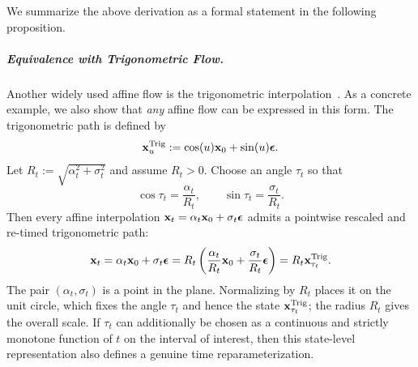 We summarize the above derivation as a formal statement in the following proposition.


\subparagraph{Equivalence with Trigonometric Flow.}
Another widely used affine flow is the trigonometric interpolation~\citep{salimans2021progressive,albergo2023stochastic,lu2024simplifying}. 
As a concrete example, we also show that \emph{any} affine flow can be expressed in this form. 
The trigonometric path is defined by
\begin{align}\label{eq:trig-para}
{\mathbf{x}}^{\mathrm{Trig}}_u := \cos(u) {\mathbf{x}}_0 + \sin(u){\bm{\epsilon}} .
\end{align}
Let $R_t := \sqrt{\alpha_t^2 + \sigma_t^2}$ and assume $R_t>0$. Choose an angle $\tau_t$ so that
\[
\cos \tau_t = \frac{\alpha_t}{R_t},
\qquad
\sin \tau_t = \frac{\sigma_t}{R_t}.
\]
Then every affine interpolation ${\mathbf{x}}_t=\alpha_t{\mathbf{x}}_0+\sigma_t{\bm{\epsilon}}$ admits a pointwise rescaled and re-timed trigonometric path:
\begin{align}\label{eq:any-to-trig}
{\mathbf{x}}_t
= \alpha_t{\mathbf{x}}_0+\sigma_t{\bm{\epsilon}}
= R_t \left(\frac{\alpha_t}{R_t}{\mathbf{x}}_0+\frac{\sigma_t}{R_t}{\bm{\epsilon}}\right)
= R_t {\mathbf{x}}^{\mathrm{Trig}}_{\tau_t}.
\end{align}
The pair $(\alpha_t,\sigma_t)$ is a point in the plane. Normalizing by $R_t$ places it on the unit circle, which fixes the angle $\tau_t$ and hence the state ${\mathbf{x}}^{\mathrm{Trig}}_{\tau_t}$; the radius $R_t$ gives the overall scale. If $\tau_t$ can additionally be chosen as a continuous and strictly monotone
function of $t$ on the interval of interest, then this state-level
representation also defines a genuine time reparameterization.

